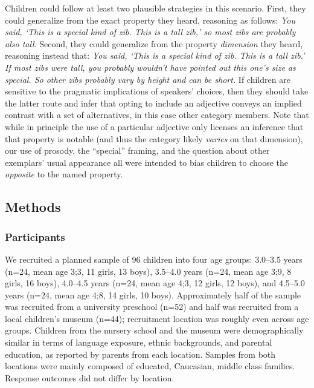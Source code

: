 \documentclass[man]{apa2}
\begin{document}
Children could follow at least two plausible strategies in this scenario. First, they could generalize from the exact property they heard, reasoning as follows: \emph{You said, `This is a special kind of zib. This is a tall zib,' so most zibs are probably also tall}. Second, they could generalize from the property \emph{dimension} they heard, reasoning instead that: \emph{You said, `This is a special kind of zib. This is a tall zib.' If most zibs were tall, you probably wouldn't have pointed out this one's size as special. So other zibs probably vary by height and can be short.} If children are sensitive to the pragmatic implications of speakers' choices, then they should take the latter route and infer that opting to include an adjective conveys an implied contrast with a set of alternatives, in this case other category members. Note that while in principle the use of a particular adjective only licenses an inference that that property is notable (and thus the category likely \emph{varies} on that dimension), our use of prosody, the ``special'' framing, and the question about other exemplars' usual appearance all were intended to bias children to choose the \emph{opposite} to the named property.


\subsection{Methods}

\subsubsection{Participants}

We recruited a planned sample of 96 children into four age groups: 3.0--3.5 years (n=24, mean age 3;3, 11 girls, 13 boys), 3.5--4.0 years (n=24, mean age 3;9, 8 girls, 16 boys), 4.0--4.5 years (n=24, mean age 4;3, 12 girls, 12 boys), and 4.5--5.0 years (n=24, mean age 4;8, 14 girls, 10 boys).  Approximately half of the sample was recruited from a university preschool (n=52) and half was recruited from a local children's museum (n=44); recruitment location was roughly even across age groups. Children from the nursery school and the museum were demographically similar in terms of language exposure, ethnic backgrounds, and parental education, as reported by parents from each location. Samples from both locations were mainly composed of educated, Caucasian, middle class families. Response outcomes did not differ by location.
\end{document}
